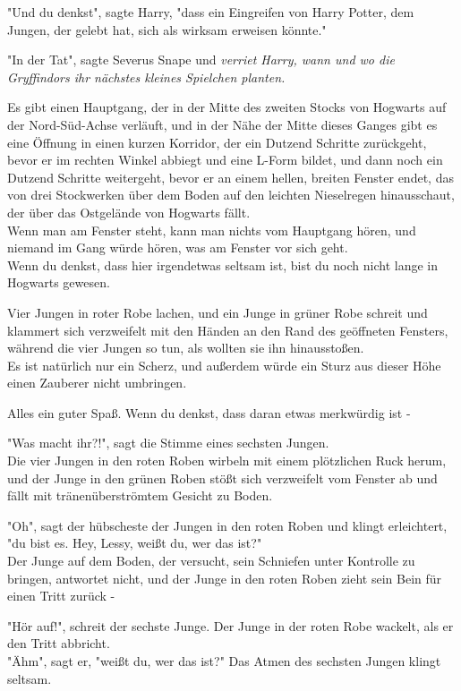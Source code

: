 {"Und du denkst", sagte Harry, "dass ein Eingreifen von Harry Potter, dem Jungen, der gelebt hat, sich als wirksam erweisen könnte."

"In der Tat", sagte Severus Snape und \emph{verriet Harry, wann und wo die Gryffindors ihr nächstes kleines Spielchen planten.}

Es gibt einen Hauptgang, der in der Mitte des zweiten Stocks von Hogwarts auf der Nord-Süd-Achse verläuft, und in der Nähe der Mitte dieses Ganges gibt es eine Öffnung in einen kurzen Korridor, der ein Dutzend Schritte zurückgeht, bevor er im rechten Winkel abbiegt und eine L-Form bildet, und dann noch ein Dutzend Schritte weitergeht, bevor er an einem hellen, breiten Fenster endet, das von drei Stockwerken über dem Boden auf den leichten Nieselregen hinausschaut, der über das Ostgelände von Hogwarts fällt.\\ Wenn man am Fenster steht, kann man nichts vom Hauptgang hören, und niemand im Gang würde hören, was am Fenster vor sich geht.\\ Wenn du denkst, dass hier irgendetwas seltsam ist, bist du noch nicht lange in Hogwarts gewesen.

Vier Jungen in roter Robe lachen, und ein Junge in grüner Robe schreit und klammert sich verzweifelt mit den Händen an den Rand des geöffneten Fensters, während die vier Jungen so tun, als wollten sie ihn hinausstoßen.\\ Es ist natürlich nur ein Scherz, und außerdem würde ein Sturz aus dieser Höhe einen Zauberer nicht umbringen.

Alles ein guter Spaß. Wenn du denkst, dass daran etwas merkwürdig ist -

"Was macht ihr?!", sagt die Stimme eines sechsten Jungen.\\ Die vier Jungen in den roten Roben wirbeln mit einem plötzlichen Ruck herum, und der Junge in den grünen Roben stößt sich verzweifelt vom Fenster ab und fällt mit tränenüberströmtem Gesicht zu Boden.

"Oh", sagt der hübscheste der Jungen in den roten Roben und klingt erleichtert,\\ "du bist es. Hey, Lessy, weißt du, wer das ist?"\\ Der Junge auf dem Boden, der versucht, sein Schniefen unter Kontrolle zu bringen, antwortet nicht, und der Junge in den roten Roben zieht sein Bein für einen Tritt zurück -

"Hör auf!", schreit der sechste Junge. Der Junge in der roten Robe wackelt, als er den Tritt abbricht.\\ "Ähm", sagt er, "weißt du, wer das ist?" Das Atmen des sechsten Jungen klingt seltsam.

}
